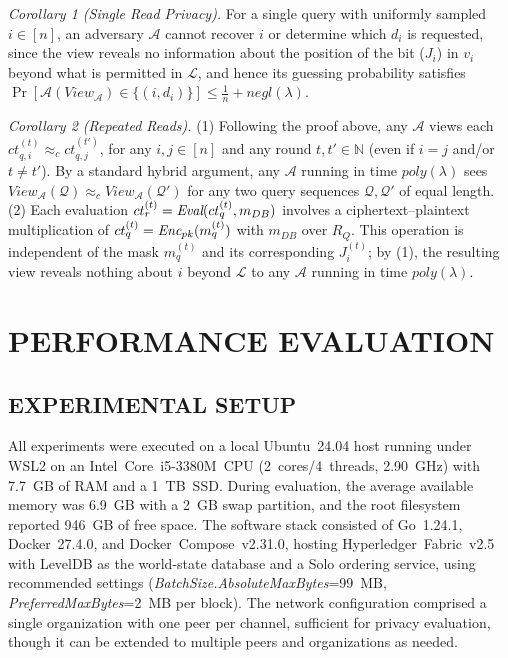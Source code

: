 \documentclass{ieeetj}
\begin{document}
\emph{Corollary 1 (Single Read Privacy).} 
For a single query with uniformly sampled $i\in[n]$, an adversary $\mathcal{A}$ cannot recover $i$ or determine which $d_i$ is requested, since the view reveals
no information about the position of the bit ($J_i$) in $v_i$ beyond what is permitted in $\mathcal{L}$, and hence its guessing probability satisfies
$\Pr[\mathcal{A}(View_{\mathcal{A}}) \in \{(i,d_i)\}] \leq \tfrac{1}{n} + negl(\lambda)$.

\emph{Corollary 2 (Repeated Reads).}
(1) Following the proof above, any $\mathcal{A}$ views each $ct_{q,i}^{(t)} \approx_c ct_{q,j}^{(t')}$,
for any $i,j \in [n]$ and any round $t,t' \in \mathbb{N}$ (even if $i = j$ and/or $t \neq t'$).
By a standard hybrid argument, any $\mathcal{A}$ running in time $poly(\lambda)$ sees
$View_{\mathcal{A}}(\mathcal{Q}) \approx_c View_{\mathcal{A}}(\mathcal{Q}')$ for any two query sequences $\mathcal{Q}, \mathcal{Q}'$
of equal length.
(2) Each evaluation $ct_r^{(t)} = \emph{Eval}(ct_q^{(t)}, m_{DB})$ involves
a ciphertext--plaintext multiplication of $ct_q^{(t)}=\emph{Enc}_{pk}(m_q^{(t)})$
with $m_{DB}$ over $R_Q$. This operation is independent of the mask $m_q^{(t)}$ and its corresponding $J_i^{(t)}$;
by (1), the resulting view reveals nothing about $i$ beyond $\mathcal{L}$ to any $\mathcal{A}$ running in time $poly(\lambda)$.

\section{PERFORMANCE EVALUATION}\label{sec:evaluation}
\subsection{EXPERIMENTAL SETUP}

All experiments were executed on a local Ubuntu~24.04 host running under WSL2 on an Intel~Core~i5-3380M~CPU 
(2~cores/4~threads, 2.90~GHz) with 7.7~GB of RAM and a 1~TB~SSD. 
During evaluation, the average available memory was 6.9~GB with a 2~GB swap partition, 
and the root filesystem reported 946~GB of free space.
The software stack consisted of Go~1.24.1, Docker~27.4.0, and Docker~Compose~v2.31.0, 
hosting Hyperledger~Fabric~v2.5 with LevelDB as the world-state database and a Solo ordering service, using recommended settings 
(\emph{BatchSize.AbsoluteMaxBytes}=99~MB, \emph{PreferredMaxBytes}=2~MB per block).
The network configuration comprised a single organization with one peer per channel, 
sufficient for privacy evaluation, though it can be extended to multiple peers and organizations as needed.
\end{document}
